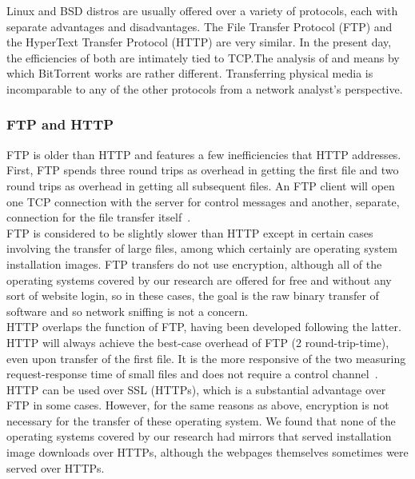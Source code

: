 \documentclass[conference]{IEEEtran}
\begin{document}
Linux and BSD distros are usually offered over a variety of protocols,
each with separate advantages and disadvantages. The File Transfer Protocol (FTP) and 
the HyperText Transfer Protocol (HTTP) are very
similar. In the present day, the efficiencies of both are intimately
tied to TCP.\@ The analysis of and means by which BitTorrent works are rather different. Transferring physical media is incomparable to any of
the other protocols from a network analyst's perspective.

\subsubsection{FTP and HTTP}

FTP is older than HTTP and features a few
inefficiencies that HTTP addresses. First, FTP spends three round trips
as overhead in getting the first file and two round trips
as overhead in getting all subsequent files.
An FTP client will open one TCP connection with the server for control
messages and another, separate, connection for the file transfer itself~\cite{rttperf}.\\
\indent FTP is considered to be slightly slower than HTTP except
in certain cases involving the transfer of large files,
among which certainly are operating system installation images. FTP transfers do not
use encryption, although all of the operating systems covered by our
research are offered for free and without any sort of website login, so
in these cases, the goal is the raw binary transfer of software and so
network sniffing is not a concern.\\
\indent 
HTTP overlaps the function of FTP, having been
developed following the latter. HTTP will always achieve the best-case
overhead of FTP (2 round-trip-time), even upon transfer of the first
file. It is the more responsive of the two measuring request-response
time of small files and does not require a control channel~\cite{rttperf}.
HTTP can be used over SSL (HTTPs), which is a substantial advantage over
FTP in some cases. However, for the same reasons as above, encryption is
not necessary for the transfer of these operating system. We found that none of
the operating systems covered by our research had mirrors that served
installation image downloads over HTTPs, although the webpages themselves sometimes were served over HTTPs.
\end{document}
